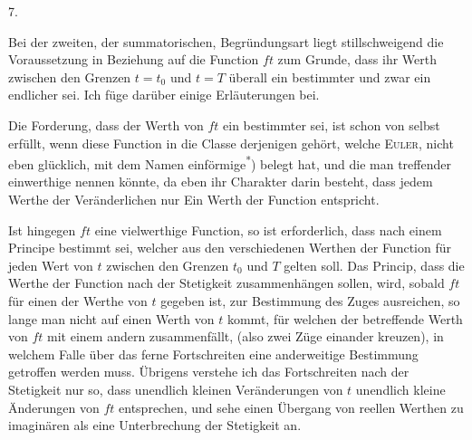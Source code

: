 \begin{center}7.\end{center}
\noindent\hspace*{\parindent}Bei der zweiten, der summatorischen, Begründungsart liegt stillschweigend die Voraussetzung in Beziehung auf die Function \(ft\) zum Grunde, dass ihr
\clearpage{}
\noindent Werth zwischen den Grenzen \(t=t_0\) und \(t=T\) überall ein bestimmter und zwar ein endlicher sei. Ich füge darüber einige Erläuterungen bei.

Die Forderung, dass der Werth von \(ft\) ein bestimmter sei, ist schon von selbst erfüllt, wenn diese Function in die Classe derjenigen gehört, welche \textsc{Euler}, nicht eben glücklich, mit dem Namen einförmige\textsuperscript{*}) belegt hat, und die man treffender einwerthige nennen könnte, da eben ihr Charakter darin besteht, dass jedem Werthe der Veränderlichen nur Ein Werth der Function entspricht.

Ist hingegen \(ft\) eine vielwerthige Function, so ist erforderlich, dass nach einem Principe bestimmt sei, welcher aus den verschiedenen Werthen der Function für jeden Wert von \(t\) zwischen den Grenzen \(t_0\) und \(T\) gelten soll. Das Princip, dass die Werthe der Function nach der Stetigkeit zusammenhängen sollen, wird, sobald \(ft\) für einen der Werthe von \(t\) gegeben ist, zur Bestimmung des Zuges ausreichen, so lange man nicht auf einen Werth von \(t\) kommt, für welchen der betreffende Werth von \(ft\) mit einem andern zusammenfällt, (also zwei Züge einander kreuzen), in welchem Falle über das ferne Fortschreiten eine anderweitige Bestimmung getroffen werden muss. Übrigens verstehe ich das Fortschreiten nach der Stetigkeit nur so, dass unendlich kleinen Veränderungen von \(t\) unendlich kleine Änderungen von \(ft\) entsprechen, und sehe einen Übergang von reellen Werthen zu imaginären  als eine Unterbrechung der Stetigkeit an.

